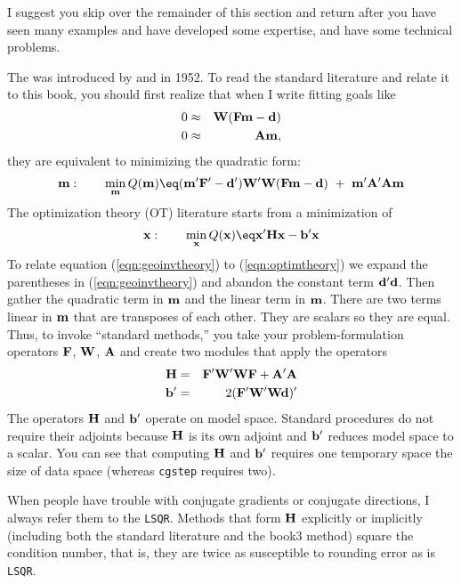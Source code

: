 \par
I suggest you skip over the remainder of this section and return
after you have seen many examples and have developed some expertise,
and have some technical problems.
\par
The  was introduced
by  and  in 1952.
To read the standard literature and relate it to this book,
you should first realize that when I write fitting goals like
\begin{eqnarray}
 0  &\approx&  \bold W( \bold F \bold m - \bold d ) \\
 0  &\approx&  \bold A \bold m,
\end{eqnarray}
they are equivalent to minimizing the quadratic form:
\begin{equation}
\bold  m:  \quad\quad
\min_{\bold m}  Q(\bold m) \eq
( \bold m'\bold F' - \bold d')\bold W'\bold W
( \bold F \bold m  - \bold d)
\ +\ \bold m'\bold A'\bold A\bold m
\label{eqn:geoinvtheory}
\end{equation}
The optimization theory (OT) literature starts from a minimization of
\begin{equation}
 \bold x:  \quad\quad
 \min_{\bold x} Q(\bold x) \eq \bold x'\bold H \bold x - \bold b' \bold x
\label{eqn:optimtheory}
\end{equation}
To relate equation (\ref{eqn:geoinvtheory}) to (\ref{eqn:optimtheory})
we expand the parentheses in (\ref{eqn:geoinvtheory}) 
and abandon the constant term $\bold d'\bold d$.
Then gather the quadratic term in $\bold m$ and the linear term in $\bold m$.
There are two terms linear in $\bold m$
that are transposes of each other.
They are scalars so they are equal.
Thus, to invoke ``standard methods,'' you take
your problem-formulation operators $\bold F$, $\bold W$, $\bold A$
and create two modules that apply the operators
\begin{eqnarray}
 \bold H   &=&  \bold F'\bold W'\bold W\bold F + \bold A'\bold A  \\
 \bold b'  &=&  2(\bold F'\bold W'\bold W\bold d)'
\end{eqnarray}
The operators $\bold H$ and $\bold b'$ operate on model space.
Standard procedures do not require their adjoints
because $\bold H$ is its own adjoint and $\bold b'$
reduces model space to a scalar.
You can see that computing $\bold H$ and $\bold b'$ requires
one temporary space the size of data space
(whereas \texttt{cgstep} requires two).
\par
When people have trouble with conjugate gradients or conjugate
directions, I always refer them to the  {\tt LSQR}.  Methods that form $\bold H$ explicitly or
implicitly (including both the standard literature and the book3
method) square the condition number, that is, they are twice as
susceptible to rounding error as is {\tt LSQR}.

